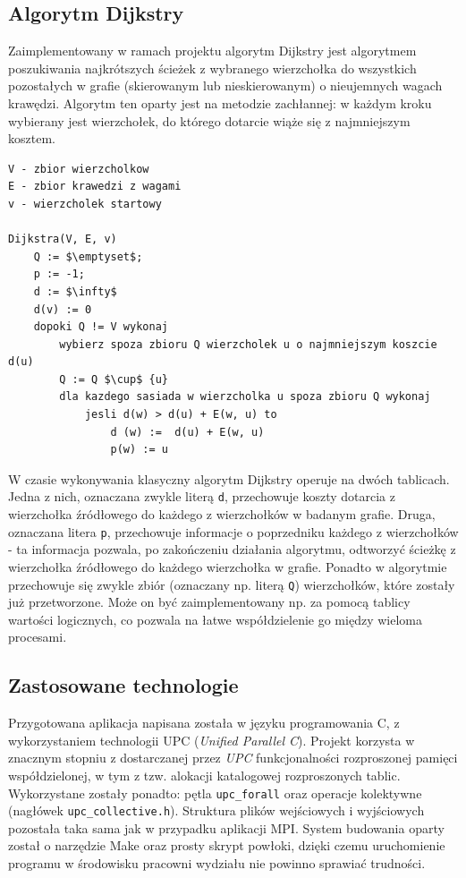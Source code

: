 \documentclass[12pt]{article}
\begin{document}
\subsection{Algorytm Dijkstry}
Zaimplementowany w ramach projektu algorytm Dijkstry jest algorytmem poszukiwania najkrótszych ścieżek z wybranego wierzchołka do wszystkich pozostałych w grafie (skierowanym lub nieskierowanym) o nieujemnych wagach krawędzi. Algorytm ten oparty jest na metodzie zachłannej: w każdym kroku wybierany jest wierzchołek, do którego dotarcie wiąże się z najmniejszym kosztem.

\begin{lstlisting}[caption={Pseudokod klasycznego algorytmu Dijkstry.}, captionpos=b, mathescape=true, basicstyle=\scriptsize]
V - zbior wierzcholkow
E - zbior krawedzi z wagami
v - wierzcholek startowy

Dijkstra(V, E, v)
    Q := $\emptyset$;
    p := -1;
    d := $\infty$
    d(v) := 0
    dopoki Q != V wykonaj
        wybierz spoza zbioru Q wierzcholek u o najmniejszym koszcie d(u)
        Q := Q $\cup$ {u}
        dla kazdego sasiada w wierzcholka u spoza zbioru Q wykonaj
            jesli d(w) > d(u) + E(w, u) to
                d (w) :=  d(u) + E(w, u)
                p(w) := u
\end{lstlisting}


W czasie wykonywania klasyczny algorytm Dijkstry operuje na dwóch tablicach. Jedna z nich, oznaczana zwykle literą \lstinline{d}, przechowuje koszty dotarcia z wierzchołka źródłowego do każdego z wierzchołków w badanym grafie. Druga, oznaczana litera \lstinline{p}, przechowuje informacje o poprzedniku każdego z wierzchołków - ta informacja pozwala, po zakończeniu działania algorytmu, odtworzyć ścieżkę z wierzchołka źródłowego do każdego wierzchołka w grafie. Ponadto w algorytmie przechowuje się zwykle zbiór (oznaczany np. literą \lstinline{Q}) wierzchołków, które zostały już przetworzone. Może on być zaimplementowany np. za pomocą tablicy wartości logicznych, co pozwala na łatwe współdzielenie go między wieloma procesami.


\subsection{Zastosowane technologie}
Przygotowana aplikacja napisana została w języku programowania C, z wykorzystaniem technologii UPC (\textit{Unified Parallel C}). Projekt korzysta w znacznym stopniu z dostarczanej przez \textit{UPC} funkcjonalności rozproszonej pamięci współdzielonej, w tym z tzw. alokacji katalogowej rozproszonych tablic. Wykorzystane zostały ponadto: pętla \lstinline{upc_forall} oraz operacje kolektywne (nagłówek \lstinline{upc_collective.h}). Struktura plików wejściowych i wyjściowych pozostała taka sama jak w przypadku aplikacji MPI. System budowania oparty został o narzędzie Make oraz prosty skrypt powłoki, dzięki czemu uruchomienie programu w środowisku pracowni wydziału nie powinno sprawiać trudności.
\end{document}
